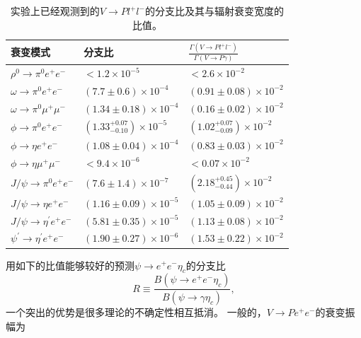 \begin{table}[!htbp]
    \centering
    \caption{%
        实验上已经观测到的$V \to P l^{+} l^{-}$的分支比及其与辐射衰变宽度的比值\cite{Tanabashi:2018oca}。
    }%
    \label{tab:summaryresult}
    \begin{tabular}{p{3.5cm}p{3.5cm}<{\centering}p{3.5cm}<{\centering}}
        \toprule
        衰变模式  &  分支比 &  $\frac{\Gamma(V \to P l^{+} l^{-})}{\Gamma(V \to P \gamma)}$  \\
        \midrule
        $\rho^{0} \to \pi^{0} e^{+}  e^{-}$  &  $<1.2 \times 10^{-5}$ &  $<2.6 \times 10^{-2}$   \\
        $\omega \to \pi^{0} e^{+}  e^{-}$  &  $(7.7\pm0.6) \times 10^{-4}$  &  $(0.91\pm0.08) \times 10^{-2}$    \\
        $\omega \to \pi^{0} \mu^{+}  \mu^{-}$  &  $(1.34\pm0.18) \times 10^{-4}$  &  $(0.16\pm0.02) \times 10^{-2}$     \\
        $\phi \to \pi^{0} e^{+}  e^{-}$  &  $(1.33^{+0.07}_{-0.10}) \times 10^{-5}$  &  $(1.02^{+0.07}_{-0.09}) \times 10^{-2}$    \\
        $\phi \to \eta e^{+}  e^{-}$  &  $(1.08\pm0.04) \times 10^{-4}$  &  $(0.83\pm0.03) \times 10^{-2}$    \\
        $\phi \to \eta \mu^{+}  \mu^{-}$  &  $<9.4 \times 10^{-6}$  &  $<0.07 \times 10^{-2}$    \\
        $J/\psi \to \pi^{0} e^{+} e^{-}$  &  $(7.6\pm1.4) \times 10^{-7}$   & $(2.18^{+0.45}_{-0.44}) \times 10^{-2}$  \\
        $J/\psi \to \eta e^{+} e^{-}$  &  $(1.16\pm0.09) \times 10^{-5}$  &  $(1.05\pm0.09) \times 10^{-2}$  \\
        $J/\psi \to \eta^{\prime} e^{+} e^{-}$  &  $(5.81\pm0.35) \times 10^{-5}$  &  $(1.13\pm0.08) \times 10^{-2}$   \\
        $\psi^{\prime} \to \eta^{\prime} e^{+} e^{-}$  &  $(1.90\pm0.27) \times 10^{-6}$   &  $(1.53\pm0.22) \times 10^{-2}$   \\
        \bottomrule
    \end{tabular}%
\end{table}
用如下的比值能够较好的预测$\psi \to e^+ e^-  \eta_c$的分支比
\begin{equation}
\label{eq:R-jpsipolar}
    R \equiv \frac{B(\psi \to e^+ e^-  \eta_c)}{B(\psi \to \gamma \eta_{c})},
\end{equation}
一个突出的优势是很多理论的不确定性相互抵消。
一般的，$V \to P e^{+} e^{-}$的衰变振幅为\cite{Landsberg:1986sk,Landsberg:1986fd,Fu:2011yy}
